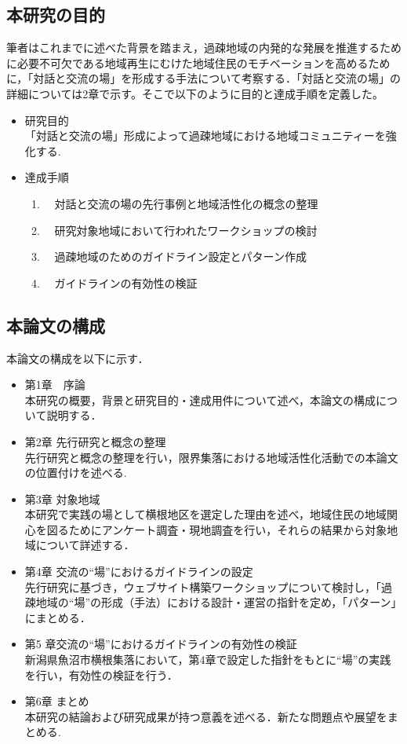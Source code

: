 \documentclass[a4paper]{jsarticle}
\begin{document}
\subsection{本研究の目的}
筆者はこれまでに述べた背景を踏まえ，過疎地域の内発的な発展を推進するために必要不可欠である地域再生にむけた地域住民のモチベーションを高めるために，「対話と交流の場」を形成する手法について考察する．「対話と交流の場」の詳細については2章で示す。そこで以下のように目的と達成手順を定義した。
\begin{itemize}
\item 研究目的　\\「対話と交流の場」形成によって過疎地域における地域コミュニティーを強化する.

\item 達成手順\\
\begin{enumerate}
\item　対話と交流の場の先行事例と地域活性化の概念の整理
\item　研究対象地域において行われたワークショップの検討
\item　過疎地域のためのガイドライン設定とパターン作成
\item　ガイドラインの有効性の検証
\end{enumerate}

\end{itemize}

\subsection{本論文の構成}
本論文の構成を以下に示す．
\begin{itemize}
\item 第1章　序論  \\本研究の概要，背景と研究目的・達成用件について述べ，本論文の構成について説明する．
\item 第2章 先行研究と概念の整理  \\先行研究と概念の整理を行い，限界集落における地域活性化活動での本論文の位置付けを述べる.

\item 第3章 対象地域  \\本研究で実践の場として横根地区を選定した理由を述べ，地域住民の地域関心を図るためにアンケート調査・現地調査を行い，それらの結果から対象地域について詳述する．
\item 第4章 交流の“場”におけるガイドラインの設定 \\先行研究に基づき，ウェブサイト構築ワークショップについて検討し，「過疎地域の“場”の形成（手法）における設計・運営の指針を定め，「パターン」にまとめる．

\item 第5 章交流の“場”におけるガイドラインの有効性の検証 \\新潟県魚沼市横根集落において，第4章で設定した指針をもとに“場”の実践を行い，有効性の検証を行う．
\item 第6章 まとめ \\本研究の結論および研究成果が持つ意義を述べる．新たな問題点や展望をまとめる.


\end{itemize}
\newpage
\end{document}
